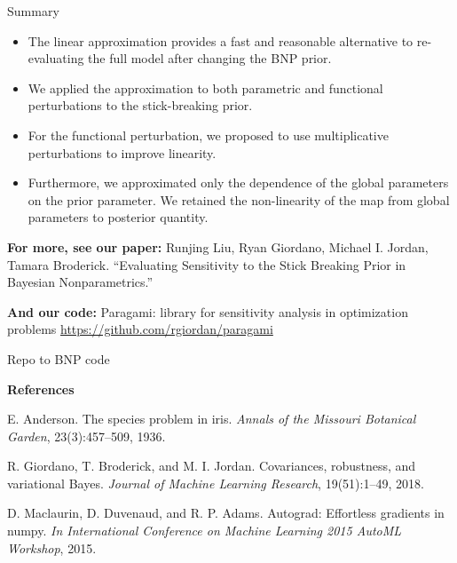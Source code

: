 \documentclass[10pt]{beamer}\usepackage[]{graphicx}\usepackage[]{color}
\begin{document}
\begin{frame}{Summary}

\begin{itemize}

\item The linear approximation provides a fast and reasonable alternative to re-evaluating the full model after changing the BNP prior. 

\pause 

\item We applied the approximation to both parametric and functional perturbations to the stick-breaking prior.

\pause 

\item For the functional perturbation, we proposed to use multiplicative perturbations to improve linearity. 

\pause 

\item Furthermore, we approximated only the dependence of the global parameters on the prior parameter. We retained the non-linearity of the map from global parameters to posterior quantity.

\end{itemize}


\end{frame}

\begin{frame}

{\bf For more, see our paper: }\newline
Runjing Liu, Ryan Giordano, Michael I. Jordan, Tamara Broderick. \newline
“Evaluating Sensitivity to the Stick Breaking Prior in Bayesian Nonparametrics.” 

{\bf And our code: }\newline
Paragami: library for sensitivity analysis in optimization problems \newline
{\color{blue}\url{https://github.com/rgiordan/paragami}}

Repo to BNP code

\vspace{0.2in}

\begin{scriptsize}

{\bf References}

E. Anderson. The species problem in iris. {\itshape Annals of the Missouri Botanical Garden}, 23(3):457–509, 1936.

R. Giordano, T. Broderick, and M. I. Jordan. Covariances, robustness, and variational Bayes. {\itshape Journal of Machine Learning Research}, 19(51):1–49, 2018.

D. Maclaurin, D. Duvenaud, and R. P. Adams. Autograd: Effortless gradients in numpy. {\itshape In International Conference on Machine Learning 2015 AutoML Workshop}, 2015.

\end{scriptsize}

\end{frame}
\end{document}
